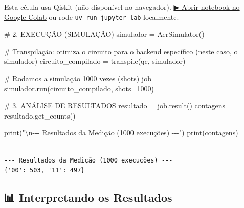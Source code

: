\documentclass[
  brazilian,
]{report}
\newenvironment{Shaded}{\begin{snugshade}}{\end{snugshade}}
\newcommand{\BuiltInTok}[1]{\textcolor[rgb]{0.00,0.23,0.31}{#1}}
\newcommand{\CharTok}[1]{\textcolor[rgb]{0.13,0.47,0.30}{#1}}
\newcommand{\CommentTok}[1]{\textcolor[rgb]{0.37,0.37,0.37}{#1}}
\newcommand{\DecValTok}[1]{\textcolor[rgb]{0.68,0.00,0.00}{#1}}
\newcommand{\NormalTok}[1]{\textcolor[rgb]{0.00,0.23,0.31}{#1}}
\newcommand{\OperatorTok}[1]{\textcolor[rgb]{0.37,0.37,0.37}{#1}}
\newcommand{\StringTok}[1]{\textcolor[rgb]{0.13,0.47,0.30}{#1}}
\begin{document}
\begin{tcolorbox}[enhanced jigsaw, arc=.35mm, bottomrule=.15mm, bottomtitle=1mm, breakable, colback=white, colbacktitle=quarto-callout-warning-color!10!white, colframe=quarto-callout-warning-color-frame, coltitle=black, left=2mm, leftrule=.75mm, opacityback=0, opacitybacktitle=0.6, rightrule=.15mm, title=\textcolor{quarto-callout-warning-color}{\faExclamationTriangle}\hspace{0.5em}{⚛️ Célula Qiskit --- execute no Colab ou localmente}, titlerule=0mm, toprule=.15mm, toptitle=1mm]

Esta célula usa Qiskit (não disponível no navegador).
\href{https://colab.research.google.com/github/maxwellamaral/aula-quantum/blob/main/notebooks/01-intro.ipynb}{▶
Abrir notebook no Google Colab} ou rode \texttt{uv\ run\ jupyter\ lab}
localmente.

\begin{Shaded}
\begin{Highlighting}[]


\CommentTok{\# 2. EXECUÇÃO (SIMULAÇÃO)}
\NormalTok{simulador }\OperatorTok{=}\NormalTok{ AerSimulator()}

\CommentTok{\# Transpilação: otimiza o circuito para o backend específico (neste caso, o simulador)}
\NormalTok{circuito\_compilado }\OperatorTok{=}\NormalTok{ transpile(qc, simulador)}

\CommentTok{\# Rodamos a simulação 1000 vezes (shots)}
\NormalTok{job }\OperatorTok{=}\NormalTok{ simulador.run(circuito\_compilado, shots}\OperatorTok{=}\DecValTok{1000}\NormalTok{)}

\CommentTok{\# 3. ANÁLISE DE RESULTADOS}
\NormalTok{resultado }\OperatorTok{=}\NormalTok{ job.result()}
\NormalTok{contagens }\OperatorTok{=}\NormalTok{ resultado.get\_counts()}

\BuiltInTok{print}\NormalTok{(}\StringTok{"}\CharTok{\textbackslash{}n}\StringTok{{-}{-}{-} Resultados da Medição (1000 execuções) {-}{-}{-}"}\NormalTok{)}
\BuiltInTok{print}\NormalTok{(contagens)}
\end{Highlighting}
\end{Shaded}

\end{tcolorbox}

\begin{verbatim}

--- Resultados da Medição (1000 execuções) ---
{'00': 503, '11': 497}
\end{verbatim}

\subsection{📊 Interpretando os
Resultados}\label{interpretando-os-resultados}
\end{document}
